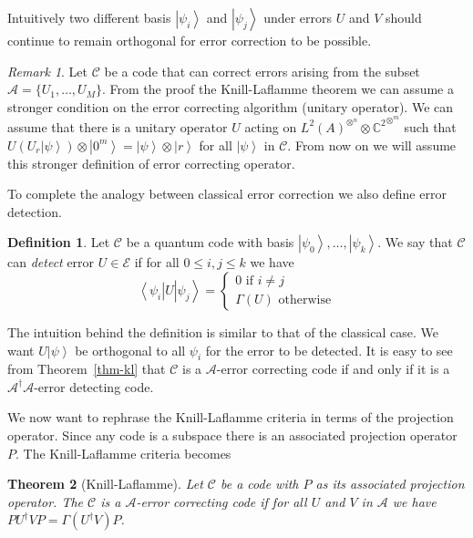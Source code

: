\documentclass[11pt,twoside]{article}
\newtheorem{theorem}{Theorem}[section]
\theoremstyle{definition}
\newtheorem{definition}[theorem]{Definition}
\theoremstyle{remark}
\newtheorem*{remark}{Remark}
\newcommand{\ket}[1]{\ensuremath{\left\vert #1 \right\rangle}}
\newcommand{\bra}[1]{\ensuremath{\left\langle #1 \right\vert}}
\newcommand{\LN}[1]{\ensuremath{L^2\left(#1\right)^{\otimes^n}}}
\newcommand{\Qbit}[0]{{\ensuremath{\mathbb{C}^2}}}
\begin{document}
Intuitively two different basis $\ket{\psi_i}$ and $\ket{\psi_j}$
under errors $U$ and $V$ should continue to remain orthogonal for
error correction to be possible.

\begin{remark}
  Let $\mathcal{C}$ be a code that can correct errors arising {from}
  the subset $\mathcal{A} = \{ U_1,\ldots, U_M\}$. {From} the proof
  the Knill-Laflamme theorem we can assume a stronger condition on the
  error correcting algorithm (unitary operator). We can assume that
  there is a unitary operator $U$ acting on $\LN{A} \otimes
  \Qbit^{\otimes^m}$ such that $U (U_r \ket{\psi}) \otimes \ket{0^m} =
  \ket{\psi} \otimes \ket{r}$ for all $\ket{\psi}$ in $\mathcal{C}$.
  {From} now on we will assume this stronger definition of error
  correcting operator.
\end{remark}

To complete the analogy between classical error correction we also
define error detection.

\begin{definition}
  Let $\mathcal{C}$ be a quantum code with basis
  $\ket{\psi_0},\ldots,\ket{\psi_k}$. We say that $\mathcal{C}$ can
  \emph{detect} error $U \in \mathcal{E}$ if for all $0 \leq i , j
  \leq k$ we have
  \[
  \bra{\psi_i}U \ket{\psi_j} = \left\{ \begin{array}{l}
      0 \textrm{ if } i \neq j \\
      \Gamma(U) \textrm{ otherwise}
    \end{array}
  \right.
  \]
\end{definition}

The intuition behind the definition is similar to that of the
classical case. We want $U \ket{\psi}$ be orthogonal to all $\psi_i$
for the error to be detected.  It is easy to see from
Theorem~\ref{thm-kl} that $\mathcal{C}$ is a $\mathcal{A}$-error
correcting code if and only if it is a
$\mathcal{A}^\dag\mathcal{A}$-error detecting code.


We now want to rephrase the Knill-Laflamme criteria in terms of the
projection operator. Since any code is a subspace there is an
associated projection operator $P$. The Knill-Laflamme criteria
becomes

\begin{theorem}[Knill-Laflamme]
  Let $\mathcal{C}$ be a code with $P$ as its associated projection
  operator.  The $\mathcal{C}$ is a $\mathcal{A}$-error correcting
  code if for all $U$ and $V$ in $\mathcal{A}$ we have $PU^\dag V P =
  \Gamma(U^\dag V) P$.
\end{theorem}
\end{document}
